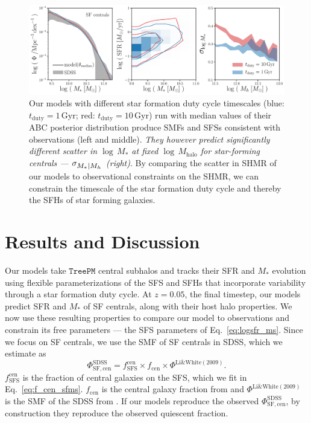 \documentclass[12pt, letterpaper, preprint, tighten]{aastex62}
\newcommand{\beq}{\begin{equation}}
\newcommand{\eeq}{\end{equation}}
\newcommand{\siglogm}{\sigma_{\scaleto{M_*|M_h}{8pt}}}
\begin{document}
\begin{figure}
\begin{center}
\includegraphics[width=\textwidth]{figs/qaplot_abc.pdf}
    \caption{Our models with different star formation duty cycle timescales
    (blue: $t_\mathrm{duty}{=}1\,\mathrm{Gyr}$; red: $t_\mathrm{duty}{=}10\,\mathrm{Gyr}$)
    run with median values of their ABC posterior distribution produce SMFs and SFSs consistent
    with observations (left and middle). \emph{They however predict significantly different
    scatter in $\log\,M_*$ at fixed $\log\,M_\mathrm{halo}$ for star-forming centrals --- $\siglogm$ (right)}.
    By comparing the scatter in SHMR of our models to observational constraints on the SHMR,
    we can constrain the timescale of the star formation duty cycle and thereby the SFHs of star
    forming galaxies.
    }
\label{fig:abc_demo}
\end{center}
\end{figure}

\section{Results and Discussion} \label{sec:results}
Our models take $\mathtt{TreePM}$ central subhalos and tracks their SFR
and $M_*$ evolution using flexible parameterizations of the SFS and SFHs
that incorporate variability through a star formation duty cycle.
At $z = 0.05$, the final timestep, our models predict SFR and $M_*$ of SF
centrals, along with their host halo properties. We now use these resulting
properties to compare our model to observations and constrain its free
parameters --- the SFS parameters of Eq.~\ref{eq:logsfr_ms}. Since we focus
on SF centrals, we use the SMF of SF centrals in SDSS, which we estimate as
\beq \label{eq:smf_sf_cen}
\Phi^\mathrm{SDSS}_\mathrm{SF,cen} = f^\mathrm{cen}_\mathrm{SFS} \times f_\mathrm{cen} \times \Phi^\mathrm{Li\&White(2009)}.
\eeq
$f^\mathrm{cen}_\mathrm{SFS}$ is the fraction of central galaxies on the
SFS, which we fit in Eq.~\ref{eq:f_cen_sfms}. $f_\mathrm{cen}$ is the
central galaxy fraction from \cite{wetzel2013} and $\Phi^\mathrm{Li\&White(2009)}$
is the SMF of the SDSS from \cite{li2009}. If our models reproduce the
observed $\Phi^\mathrm{SDSS}_\mathrm{SF,cen}$, by construction they reproduce
the observed quiescent fraction.
\end{document}
